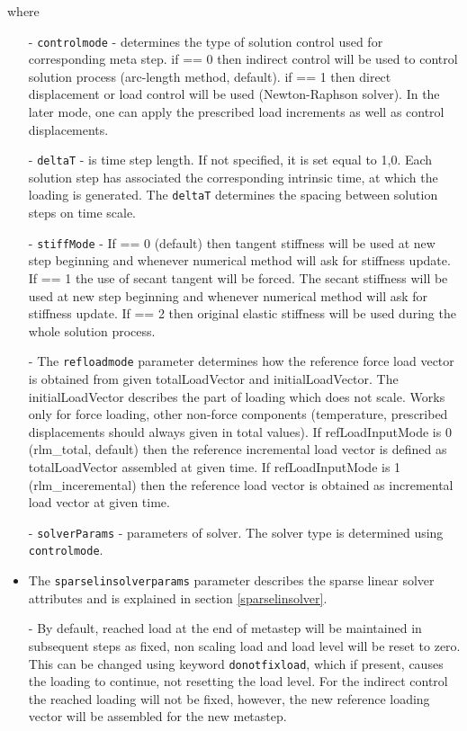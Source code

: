 \documentclass[a4paper]{article}
\newcommand{\param}[1]{\texttt{#1}} %
\begin{document}
where
\begin{itemize}
\item[-] \param{controlmode} - determines the type of solution
control used for corresponding meta step. if == 0 then indirect
control will be used to control solution process (arc-length method, default). if == 1
then direct displacement or load control will be used (Newton-Raphson solver). In the later
mode, one can apply the prescribed load increments as well as
control displacements.
\item[-] \param{deltaT} - is time step length. If not specified, it is
set equal to 1,0. Each solution step has associated the corresponding
intrinsic time, at which the loading is generated. The \param{deltaT}
determines the spacing between solution steps on time scale.
\item[-] \param{stiffMode} - If == 0 (default) then tangent stiffness will be used
at new step beginning and whenever numerical method will ask for
stiffness update. If == 1 the use of secant tangent will be forced.
The secant stiffness will be used at new step beginning
and whenever numerical method will ask for stiffness update.
If == 2 then original elastic stiffness will
be used during the whole solution process.
\item[-] The \param{refloadmode} parameter determines how the reference force load vector
is obtained from given totalLoadVector and initialLoadVector.
The initialLoadVector describes the part of loading which does not scale. Works only for force loading, other non-force components (temperature, prescribed displacements should always given in total values).
If refLoadInputMode is 0 (rlm\_total, default) then the reference incremental load vector is defined as
totalLoadVector assembled at given time.
If refLoadInputMode is 1 (rlm\_inceremental) then the reference load vector is
obtained as incremental load vector at given time.
\item[-] \param{solverParams} - parameters of solver. The solver type
is determined using \param{controlmode}.
\item The  \param{sparselinsolverparams} parameter describes the sparse
linear solver attributes and is explained in section
\ref{sparselinsolver}.
\item[-] By default, reached load at the end of
metastep will be maintained in subsequent steps as fixed, non scaling
load and load level will be reset to zero. This can be changed using keyword \param{donotfixload}, which if
present, causes the loading to continue, not resetting the load
level. For the indirect control the reached loading will not be
fixed, however, the new reference loading vector will be assembled for
the new metastep.
\end{itemize}
\end{document}
